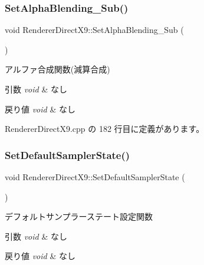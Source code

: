 \subsubsection{\texorpdfstring{Set\+Alpha\+Blending\+\_\+\+Sub()}{SetAlphaBlending\_Sub()}}
{\footnotesize\ttfamily void Renderer\+Direct\+X9\+::\+Set\+Alpha\+Blending\+\_\+\+Sub (\begin{DoxyParamCaption}{ }\end{DoxyParamCaption})}



アルファ合成関数(減算合成) 


\begin{DoxyParams}{引数}
{\em void} & なし \\
\hline
\end{DoxyParams}

\begin{DoxyRetVals}{戻り値}
{\em void} & なし \\
\hline
\end{DoxyRetVals}


 Renderer\+Direct\+X9.\+cpp の 182 行目に定義があります。

\mbox{\label{class_renderer_direct_x9_a229cd266427d96486c43d2e63300e438}} 
\subsubsection{\texorpdfstring{Set\+Default\+Sampler\+State()}{SetDefaultSamplerState()}}
{\footnotesize\ttfamily void Renderer\+Direct\+X9\+::\+Set\+Default\+Sampler\+State (\begin{DoxyParamCaption}{ }\end{DoxyParamCaption})}



デフォルトサンプラーステート設定関数 


\begin{DoxyParams}{引数}
{\em void} & なし \\
\hline
\end{DoxyParams}

\begin{DoxyRetVals}{戻り値}
{\em void} & なし \\
\hline
\end{DoxyRetVals}


